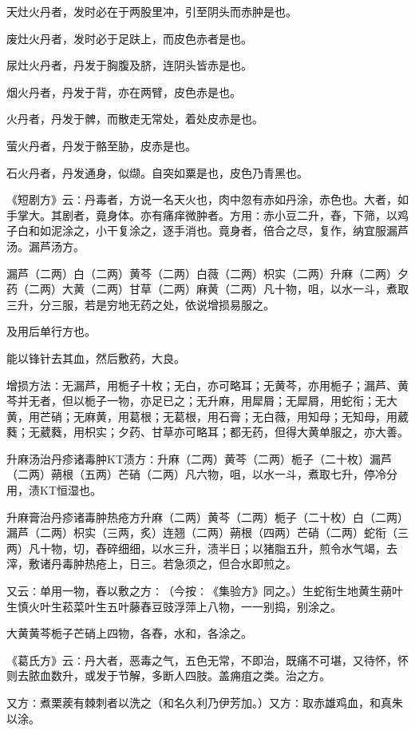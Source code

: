 \documentclass[a4paper,12pt,UTF8,twoside]{ctexbook}
\begin{document}
天灶火丹者，发时必在于两股里冲，引至阴头而赤肿是也。

废灶火丹者，发时必于足趺上，而皮色赤者是也。

尿灶火丹者，丹发于胸腹及脐，连阴头皆赤是也。

烟火丹者，丹发于背，亦在两臂，皮色赤是也。

火丹者，丹发于髀，而散走无常处，着处皮赤是也。

萤火丹者，丹发于骼至胁，皮赤是也。

石火丹者，丹发通身，似缬。自突如粟是也，皮色乃青黑也。

《短剧方》云∶丹毒者，方说一名天火也，肉中忽有赤如丹涂，赤色也。大者，如手掌大。其剧者，竟身体。亦有痛痒微肿者。方用∶赤小豆二升，舂，下筛，以鸡子白和如泥涂之，小干复涂之，逐手消也。竟身者，倍合之尽，复作，纳宜服漏芦汤。漏芦汤方。

漏芦（二两）白（二两）黄芩（二两）白薇（二两）枳实（二两）升麻（二两）夕药（二两）大黄（二两）甘草（二两）麻黄（二两）凡十物，咀，以水一斗，煮取三升，分三服，若是穷地无药之处，依说增损易服之。

及用后单行方也。

能以锋针去其血，然后敷药，大良。

增损方法∶无漏芦，用栀子十枚；无白，亦可略耳；无黄芩，亦用栀子；漏芦、黄芩并无者，但以栀子一物，亦足已之；无升麻，用犀屑；无犀屑，用蛇衔；无大黄，用芒硝；无麻黄，用葛根；无葛根，用石膏；无白薇，用知母；无知母，用葳蕤；无葳蕤，用枳实；夕药、甘草亦可略耳；都无药，但得大黄单服之，亦大善。

升麻汤治丹疹诸毒肿KT渍方∶升麻（二两）黄芩（二两）栀子（二十枚）漏芦（二两）蒴根（五两）芒硝（二两）凡六物，咀，以水一斗，煮取七升，停冷分用，渍KT恒湿也。

升麻膏治丹疹诸毒肿热疮方升麻（二两）黄芩（二两）栀子（二十枚）白（二两）漏芦（二两）枳实（三两，炙）连翘（二两）蒴根（四两）芒硝（二两）蛇衔（三两）凡十物，切，舂碎细细，以水三升，渍半日；以猪脂五升，煎令水气竭，去滓，敷诸丹毒肿热疮上，日三。若急须之，但合水即煎之。

又云∶单用一物，舂以敷之方∶（今按∶《集验方》同之。）生蛇衔生地黄生蒴叶生慎火叶生菘菜叶生五叶藤舂豆豉浮萍上八物，一一别捣，别涂之。

大黄黄芩栀子芒硝上四物，各舂，水和，各涂之。

《葛氏方》云∶丹大者，恶毒之气，五色无常，不即治，既痛不可堪，又待怀，怀则去脓血数升，或发于节解，多断人四肢。盖痈疽之类。治之方。

又方∶煮栗蒺有棘刺者以洗之（和名久利乃伊芳加。）又方∶取赤雄鸡血，和真朱以涂。
\end{document}
